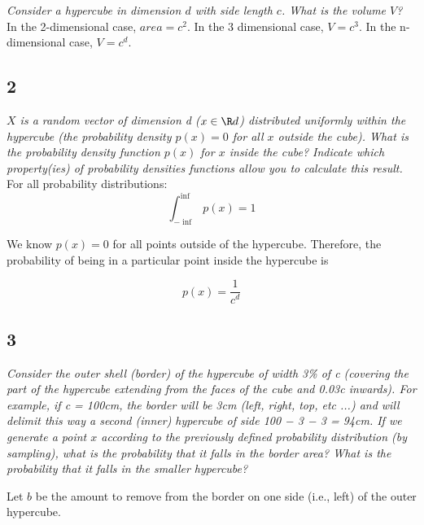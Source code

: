 \documentclass{amsart}
\theoremstyle{definition}
\theoremstyle{remark}
\numberwithin{equation}{section}
\begin{document}
\textit{Consider a hypercube in dimension $d$ with side length $c$. 
            What is the volume $V$?} \\

In the 2-dimensional case, $area = c^2$. In the 3 dimensional case, $V = c^3$. 
In the n-dimensional case, $V = c^d$. \\

\subsection{2} 

\textit{$X$ is a random vector of dimension d ($x \in \R d$) distributed 
uniformly within the hypercube (the probability density  $p(x) = 0$ for all $x$ 
outside the cube). What is the probability density function $p(x)$ for $x$ inside 
the cube? Indicate which property(ies) of probability densities functions allow 
you to calculate this result.}\\

For all probability distributions: \\

\begin{equation}
    \int_{-\inf}^{\inf}p(x) = 1
\end{equation}

We know $p(x) = 0$ for all points outside of the hypercube. Therefore,
the probability of being in a particular point inside the hypercube is

\begin{equation}
    p(x) = \frac{1}{c^d}
\end{equation}

\subsection{3} 

\textit{Consider the outer shell (border) of the hypercube of width 
3\% of c (covering the part of the hypercube extending from the faces of 
the cube and 0.03c inwards). For example, if c = 100cm, the border will
be 3cm (left, right, top, etc ...) and will delimit this way a second
(inner) hypercube of side 100 − 3 − 3 = 94cm. If we generate a point $x$
according to the previously defined probability distribution (by 
sampling), what is the probability that it falls in the border area? What
is the probability that it falls in the smaller hypercube?}

Let $b$ be the amount to remove from the border on one side (i.e., left) 
of the outer hypercube.
\end{document}
